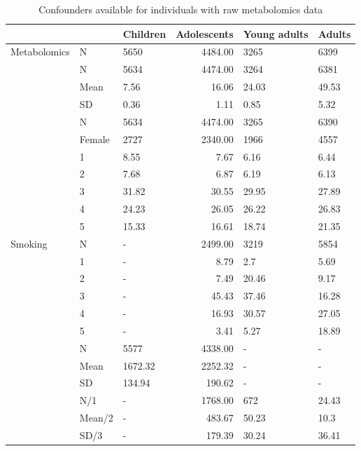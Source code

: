 \documentclass[11pt,twoside]{bristolthesis}
\begin{document}
\begin{longtable}[t]{lllrll}
\caption{\label{tab:chapter4-table-ALSPAC-confounders}Confounders available for individuals with raw metabolomics data}\\
\toprule
 &  & Children & Adolescents & Young adults & Adults\\
\midrule
Metabolomics & N & 5650 & 4484.00 & 3265 & 6399\\
\cmidrule{1-6}\pagebreak[0]
 & N & 5634 & 4474.00 & 3264 & 6381\\
\cmidrule{2-6}\nopagebreak
 & Mean & 7.56 & 16.06 & 24.03 & 49.53\\
\cmidrule{2-6}\nopagebreak
\multirow{-3}{*}{\raggedright\arraybackslash Age} & SD & 0.36 & 1.11 & 0.85 & 5.32\\
\cmidrule{1-6}\pagebreak[0]
 & N & 5634 & 4474.00 & 3265 & 6390\\
\cmidrule{2-6}\nopagebreak
\multirow{-2}{*}{\raggedright\arraybackslash Sex} & Female & 2727 & 2340.00 & 1966 & 4557\\
\cmidrule{1-6}\pagebreak[0]
 & 1 & 8.55 & 7.67 & 6.16 & 6.44\\
\cmidrule{2-6}\nopagebreak
 & 2 & 7.68 & 6.87 & 6.19 & 6.13\\
\cmidrule{2-6}\nopagebreak
 & 3 & 31.82 & 30.55 & 29.95 & 27.89\\
\cmidrule{2-6}\nopagebreak
 & 4 & 24.23 & 26.05 & 26.22 & 26.83\\
\cmidrule{2-6}\nopagebreak
\multirow{-5}{*}{\raggedright\arraybackslash Education} & 5 & 15.33 & 16.61 & 18.74 & 21.35\\
\cmidrule{1-6}\pagebreak[0]
Smoking & N & - & 2499.00 & 3219 & 5854\\
\cmidrule{1-6}\pagebreak[0]
 & 1 & - & 8.79 & 2.7 & 5.69\\
\cmidrule{2-6}\nopagebreak
 & 2 & - & 7.49 & 20.46 & 9.17\\
\cmidrule{2-6}\nopagebreak
 & 3 & - & 45.43 & 37.46 & 16.28\\
\cmidrule{2-6}\nopagebreak
 & 4 & - & 16.93 & 30.57 & 27.05\\
\cmidrule{2-6}\nopagebreak
\multirow{-5}{*}{\raggedright\arraybackslash Alcohol} & 5 & - & 3.41 & 5.27 & 18.89\\
\cmidrule{1-6}\pagebreak[0]
 & N & 5577 & 4338.00 & - & -\\
\cmidrule{2-6}\nopagebreak
 & Mean & 1672.32 & 2252.32 & - & -\\
\cmidrule{2-6}\nopagebreak
\multirow{-3}{*}{\raggedright\arraybackslash Diet} & SD & 134.94 & 190.62 & - & -\\
\cmidrule{1-6}\pagebreak[0]
 & N/1 & - & 1768.00 & 672 & 24.43\\
\cmidrule{2-6}\nopagebreak
 & Mean/2 & - & 483.67 & 50.23 & 10.3\\
\cmidrule{2-6}\nopagebreak
\multirow{-3}{*}{\raggedright\arraybackslash Physical activity} & SD/3 & - & 179.39 & 30.24 & 36.41\\
\bottomrule
\end{longtable}
\end{document}
